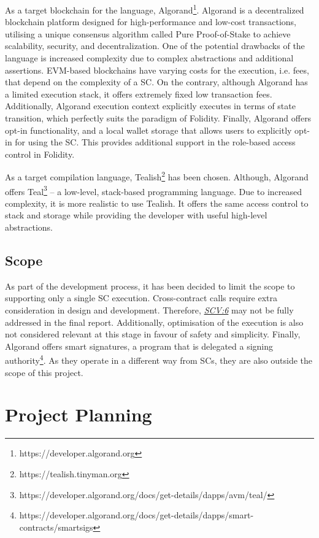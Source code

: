 \documentclass[oneside]{ecsproject}     %
\newcommand{\vref}[1]{\textit{\hyperref[#1]{#1}}}
\begin{document}
As a target blockchain for the language, Algorand\footnote{https://developer.algorand.org}. 
Algorand is a decentralized blockchain platform designed for high-performance and low-cost transactions, 
utilising a unique consensus algorithm called Pure Proof-of-Stake to achieve scalability, security, and decentralization\cite{algorand}.
One of the potential drawbacks of the language is
increased complexity due to complex abstractions and additional assertions. EVM-based blockchains have varying costs for the execution, i.e. fees,
that depend on the complexity of a SC. On the contrary, although Algorand has a limited execution stack, it offers extremely fixed low transaction fees.
Additionally, Algorand execution context explicitly executes in terms of state transition, which perfectly suits the paradigm of Folidity.
Finally, Algorand offers opt-in functionality, and a local wallet storage that allows users to explicitly opt-in for using the SC.
This provides additional support in the role-based access control in Folidity.

As a target compilation language, Tealish\footnote{https://tealish.tinyman.org} has been chosen.
Although, Algorand offers Teal\footnote{https://developer.algorand.org/docs/get-details/dapps/avm/teal/} –
a low-level, stack-based programming language. Due to increased complexity, it is more realistic to use Tealish.
It offers the same access control to stack and storage while providing the developer with useful high-level abstractions.


\section{Scope}

As part of the development process, it has been decided to limit the scope to supporting only a single SC execution.
Cross-contract calls require extra consideration in design and development. Therefore, \vref{SCV:6} may not be fully addressed in the final report.
Additionally, optimisation of the execution is also not considered relevant at this stage in favour of safety and simplicity.
Finally, Algorand offers smart signatures, a program that is delegated a signing authority\footnote{https://developer.algorand.org/docs/get-details/dapps/smart-contracts/smartsigs}.
As they operate in a different way from SCs, they are also outside the scope of this project.


\chapter{Project Planning}
\end{document}
